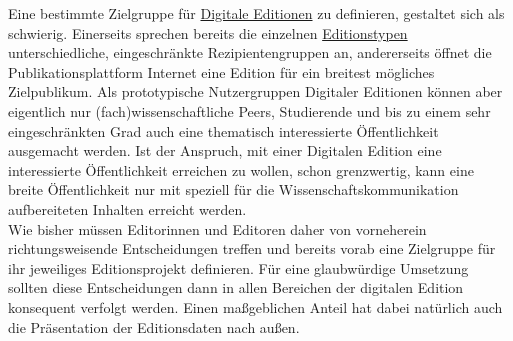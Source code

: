 \documentclass{article}
\begin{document}
    Eine bestimmte Zielgruppe für \href{http://gams.uni-graz.at/o:konde.59}{Digitale Editionen} zu definieren, gestaltet sich als schwierig. Einerseits sprechen bereits die einzelnen \href{http://gams.uni-graz.at/o:konde.76}{Editionstypen} unterschiedliche, eingeschränkte Rezipientengruppen an, andererseits öffnet die Publikationsplattform Internet eine Edition für ein breitest mögliches Zielpublikum. Als prototypische Nutzergruppen Digitaler Editionen können aber eigentlich nur (fach)wissenschaftliche Peers, Studierende und bis zu einem sehr eingeschränkten Grad auch eine thematisch interessierte Öffentlichkeit ausgemacht werden. Ist der Anspruch, mit  einer Digitalen Edition eine interessierte Öffentlichkeit erreichen zu wollen, schon grenzwertig, kann eine breite Öffentlichkeit nur mit speziell für die Wissenschaftskommunikation aufbereiteten Inhalten erreicht werden.\\
            
        Wie bisher müssen Editorinnen und Editoren daher von vorneherein richtungsweisende Entscheidungen treffen und bereits vorab eine Zielgruppe für ihr jeweiliges Editionsprojekt definieren. Für eine glaubwürdige Umsetzung sollten diese Entscheidungen dann in allen Bereichen der digitalen Edition konsequent verfolgt werden. Einen maßgeblichen Anteil hat dabei natürlich auch die Präsentation der Editionsdaten nach außen.\\
            
\end{document}
